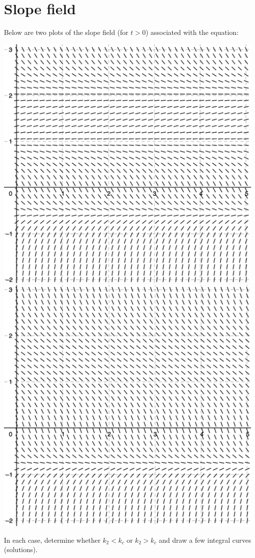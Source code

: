 \documentclass[10pt, letterpaper, answer]{exam}
\begin{document}
\section{Slope field}
Below are two plots of the slope field (for $t>0$) associated with the equation:
\begin{center}
\begin{minipage}{0.75\linewidth}
\includegraphics[width=0.35\linewidth]{Field_1} 
    \hfill
\includegraphics[width=0.35\linewidth]{Field_2}
\end{minipage}
\end{center}
In each case, determine whether $k_2<k_c$ or $k_2>k_c$ and draw a few integral curves (solutions).



\end{document}
